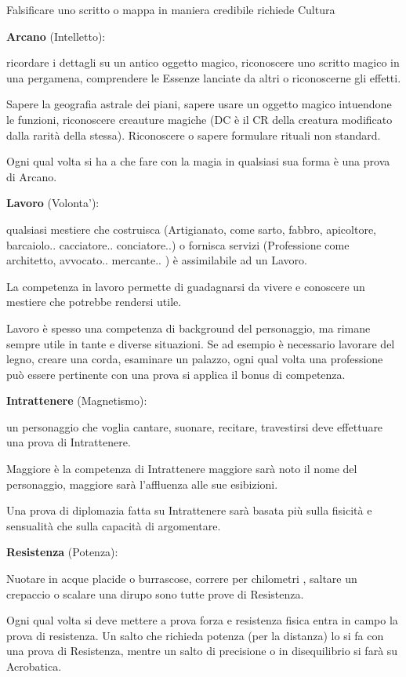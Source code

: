 \documentclass[a4paper,11pt,twoside,openany]{book}
\begin{document}
Falsificare uno scritto o mappa in maniera credibile richiede Cultura

\textbf{Arcano} (Intelletto):

ricordare i dettagli su un antico oggetto magico, riconoscere uno scritto magico in una pergamena, comprendere le Essenze lanciate da altri o riconoscerne gli effetti.

Sapere la geografia astrale dei piani, sapere usare un oggetto magico intuendone le funzioni, riconoscere creauture magiche (DC è il CR della creatura modificato dalla rarità della stessa). Riconoscere o sapere formulare rituali non standard.

Ogni qual volta si ha a che fare con la magia in qualsiasi sua forma è una prova di Arcano.

\textbf{Lavoro} (Volonta'):

qualsiasi mestiere che costruisca (Artigianato, come sarto, fabbro, apicoltore, barcaiolo.. cacciatore.. conciatore..) o fornisca servizi (Professione come architetto, avvocato.. mercante.. ) è assimilabile ad un Lavoro.

La competenza in lavoro permette di guadagnarsi da vivere e conoscere un mestiere che potrebbe rendersi utile.

Lavoro è spesso una competenza di background del personaggio, ma rimane sempre utile in tante e diverse situazioni. Se ad esempio è necessario lavorare del legno, creare una corda, esaminare un palazzo, ogni qual volta una professione può essere pertinente con una prova si applica il bonus di competenza.

\textbf{Intrattenere} (Magnetismo):

un personaggio che voglia cantare, suonare, recitare, travestirsi deve effettuare una prova di Intrattenere.

Maggiore è la competenza di Intrattenere maggiore sarà noto il nome del personaggio, maggiore sarà l'affluenza alle sue esibizioni.

Una prova di diplomazia fatta su Intrattenere sarà basata più sulla fisicità e sensualità che sulla capacità di argomentare.

\textbf{Resistenza} (Potenza):

Nuotare in acque placide o burrascose, correre per chilometri , saltare un crepaccio o scalare una dirupo sono tutte prove di Resistenza.

Ogni qual volta si deve mettere a prova forza e resistenza fisica entra in campo la prova di resistenza.
Un salto che richieda potenza (per la distanza) lo si fa con una prova di Resistenza, mentre un salto di precisione o in disequilibrio si farà su Acrobatica.
\end{document}
